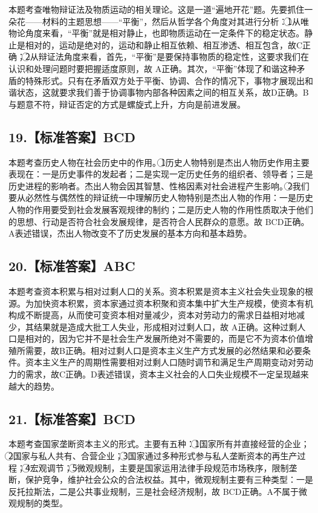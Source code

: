 \documentclass[UTF8,11pt]{ctexart}
\begin{document}
本题考查唯物辩证法及物质运动的相关理论。这是一道“遍地开花”题。先要抓住一朵花——材料的主题思想——“平衡”，然后从哲学各个角度对其进行分析：\textcircled{1}从唯物论角度来看，“平衡”就是相对静止，也即物质运动在一定条件下的稳定状态。静止是相对的，运动是绝对的，运动和静止相互依赖、相互渗透、相互包含，故C正确；\textcircled{2}从辩证法角度来看，首先，“平衡”是要保持事物质的稳定性，这要求我们在认识和处理问题时要把握适度原则，故 A正确。其次，“平衡”体现了和谐这种矛盾的特殊形式。只有在矛盾双方处于平衡、协调、合作的情况下，事物才展现出和谐状态，这就要求我们善于协调事物内部各种因素之间的相互关系，故D正确。B与题意不符，辩证否定的方式是螺旋式上升，方向是前进发展。


\subsection*{19.【标准答案】BCD}

本题考查历史人物在社会历史中的作用。\textcircled{1}历史人物特别是杰出人物历史作用主要表现在：一是历史事件的发起者；二是实现一定历史任务的组织者、领导者；三是历史进程的影响者。杰出人物会因其智慧、性格因素对社会进程产生影响。\textcircled{2}我们要从必然性与偶然性的辩证统一中理解历史人物特别是杰出人物的作用：一是历史人物的作用要受到社会发展客观规律的制约；二是历史人物的作用性质取决于他们的思想、行动是否符合社会发展规律，是否符合人民群众的意愿。故 BCD正确。A表述错误，杰出人物改变不了历史发展的基本方向和基本趋势。


\subsection*{20.【标准答案】ABC}

本题考查资本积累与相对过剩人口的关系。资本积累是资本主义社会失业现象的根源。为加快资本积累，资本家通过资本积聚和资本集中扩大生产规模，使资本有机构成不断提高，从而使可变资本相对量减少，资本对劳动力的需求日益相对地减少，其结果就是造成大批工人失业，形成相对过剩人口，故 A正确。这种过剩人口是相对的，因为它并不是社会生产发展所绝对不需要的，而是它不为资本价值增殖所需要，故B正确。相对过剩人口是资本主义生产方式发展的必然结果和必要条件。资本主义生产的周期性需要相对过剩人口随时调节和满足生产周期变动对劳动力的需求，故C正确。D表述错误，资本主义社会的人口失业规模不一定呈现越来越大的趋势。


\subsection*{21.【标准答案】BCD}

本题考查国家垄断资本主义的形式。主要有五种：\textcircled{1}国家所有并直接经营的企业；\textcircled{2}国家与私人共有、合营企业；\textcircled{3}国家通过多种形式参与私人垄断资本的再生产过程；\textcircled{4}宏观调节；\textcircled{5}微观规制，主要是国家运用法律手段规范市场秩序，限制垄断，保护竞争，维护社会公众的合法权益。其中，微观规制主要有三种类型：一是反托拉斯法，二是公共事业规制，三是社会经济规制，故 BCD正确。A不属于微观规制的类型。
\end{document}
